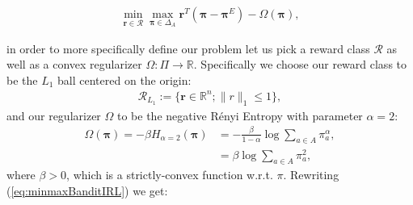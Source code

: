 \begin{equation}
    \label{eq:minmaxBanditIRL}
    \begin{aligned}
        \min_{\bm{r}\in\mathcal{R}}\max_{\bm{\pi}\in\Delta_{A}} \bm{r}^T(\bm{\pi}-\bm{\pi}^E)-\Omega(\bm{\pi}),
    \end{aligned}
\end{equation}

in order to more specifically define our problem let us pick a reward class $\mathcal{R}$ as well as a convex regularizer $\Omega:\Pi \rightarrow \mathbb{R}$. Specifically we choose our reward class to be the $L_1$ ball centered on the origin:
\begin{align*}
    \mathcal{R}_{L_1} := \lbrace \bm{r} \in \mathbb{R}^n ; \|r\|_1 \leq 1 \rbrace,
\end{align*}
and our regularizer $\Omega$ to be the negative Rényi Entropy with parameter $\alpha=2$:
\begin{align*}
    \Omega(\bm{\pi}) = -\beta H_{\alpha=2}(\bm{\pi})  &= -\frac{\beta}{1-\alpha} \log  \sum_{a \in A} \pi_a^\alpha,\\
    &= \beta \log  \sum_{a \in A} \pi_a^2,
\end{align*}
where $\beta>0$, which is a strictly-convex function w.r.t. $\pi$. Rewriting (\ref{eq:minmaxBanditIRL}) we get:

